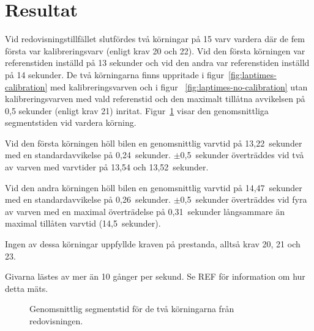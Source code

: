 \section{Resultat}

Vid redovisningstillfället slutfördes två körningar på 15 varv vardera där de
fem första var kalibreringsvarv (enligt krav 20 och 22). Vid den första
körningen var referenstiden inställd på 13 sekunder och vid den andra var
referenstiden inställd på 14 sekunder. De två körningarna finns uppritade i
figur~\ref{fig:laptimes-calibration} med kalibreringsvarven och i figur~
\ref{fig:laptimes-no-calibration} utan kalibreringsvarven med vald referenstid
och den maximalt tillåtna avvikelsen på 0,5 sekunder (enligt krav 21) inritat.
Figur~\ref{fig:segtimes} visar den genomsnittliga segmentstiden vid vardera
körning.

Vid den första körningen höll bilen en genomsnittlig varvtid på 13,22~sekunder
med en standardavvikelse på 0,24~sekunder. $\pm$0,5~sekunder överträddes vid två
av varven med varvtider på 13,54 och 13,52~sekunder.

Vid den andra körningen höll bilen en genomsnittlig varvtid på 14,47~sekunder
med en standardavvikelse på 0,26~sekunder. $\pm$0,5~sekunder överträddes vid
fyra av varven med en maximal överträdelse på 0,31~sekunder långsammare än
maximal tillåten varvtid (14,5~sekunder).

Ingen av dessa körningar uppfyllde kraven på prestanda, alltså krav 20, 21 och
23.

Givarna lästes av mer än 10 gånger per sekund. Se REF för information om hur
detta mäts.

\begin{figure}
	\centering
	\caption{Genomsnittlig segmentstid för de två körningarna från redovisningen.}
	\label{fig:segtimes}
\end{figure}

